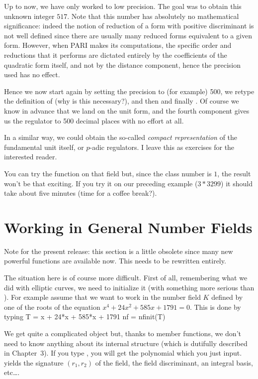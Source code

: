 Up to now, we have only worked to low precision. The goal was to obtain this
unknown integer $517$. Note that this number has absolutely no mathematical
significance: indeed the notion of reduction of a form with positive
discriminant is not well defined since there are usually many reduced forms
equivalent to a given form. However, when PARI makes its computations, the
specific order and reductions that it performs are dictated entirely by the
coefficients of the quadratic form itself, and not by the distance component,
hence the precision used has no effect.

Hence we now start again by setting the precision to (for example) 500,
we retype the definition of  (why is this necessary?), and then
 and finally . Of course we know in
advance that we land on the unit form, and the fourth component gives us the
regulator to 500 decimal places with no effort at all.

In a similar way, we could obtain the so-called {\it compact representation}
of the fundamental unit itself, or $p$-adic regulators. I leave this as
exercises for the interested reader.

You can try the  function on that field but, since the class
number is $1$, the result won't be that exciting. If you try it on our
preceding example ($3*3299$) it should take about five minutes (time for a
coffee break?).

\section{Working in General Number Fields}

Note for the present release: this section is a little obsolete since many
new powerful functions are available now. This needs to be rewritten
entirely. \smallskip

The situation here is of course more difficult. First of all, remembering
what we did with elliptic curves, we need to initialize it (with something
more serious than ). For example assume that we want to work in
the number field $K$ defined by one of the roots of the equation
$x^4+24x^2+585x+1791=0$. This is done by typing
\bprog
T = x + 24*x + 585*x + 1791
nf = nfinit(T)
\eprog

We get quite a complicated object but, thanks to member functions, we don't
need to know anything about its internal structure (which is dutifully
described in Chapter~3). If you type , you will get the
polynomial  which you just input.  yields the signature
$(r_1,r_2)$ of the field,  the field discriminant, 
an integral basis, etc\dots.

